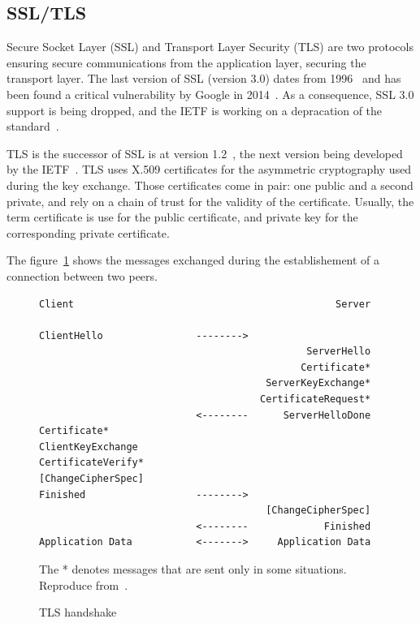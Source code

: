 \subsection{SSL/TLS}
Secure Socket Layer (SSL) and Transport Layer Security (TLS) are two protocols ensuring secure communications from the application layer, securing the transport layer.
The last version of SSL (version 3.0) dates from 1996~\cite{rfc6101} and has been found a critical vulnerability by Google in 2014~\cite{poodle}.
As a consequence, SSL 3.0 support is being dropped, and the IETF is working on a depracation of the standard~\cite{sslv3-diediedie-03}.

\noindent TLS is the successor of SSL is at version 1.2~\cite{rfc5246}, the next version being developed by the IETF~\cite{tls13-05}.
TLS uses X.509 certificates for the asymmetric cryptography used during the key exchange.
Those certificates come in pair: one public and a second private, and rely on a chain of trust for the validity of the certificate.
Usually, the term certificate is use for the public certificate, and private key for the corresponding private certificate.

\noindent The figure~\ref{fig:tls-handshake} shows the messages exchanged during the establishement of a connection between two peers.


\begin{figure}[ht]
\begin{verbatim}
Client                                             Server

ClientHello                -------->
                                              ServerHello
                                             Certificate*
                                       ServerKeyExchange*
                                      CertificateRequest*
                           <--------      ServerHelloDone
Certificate*
ClientKeyExchange
CertificateVerify*
[ChangeCipherSpec]
Finished                   -------->
                                       [ChangeCipherSpec]
                           <--------             Finished
Application Data           <------->     Application Data
\end{verbatim}
\caption{TLS handshake}{The * denotes messages that are sent only in some situations. Reproduce from~\cite{rfc5246}.}
\label{fig:tls-handshake}
\end{figure}

